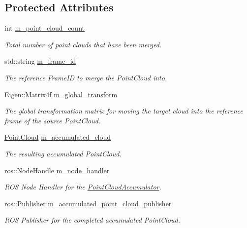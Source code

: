 \subsection*{\-Protected \-Attributes}
\begin{DoxyCompactItemize}
\item 
int \hyperlink{class_point_cloud_accumulator_a6ebb0ca53506f1ae2d0f6e411e2dff66}{m\-\_\-point\-\_\-cloud\-\_\-count}
\begin{DoxyCompactList}\small\item\em \-Total number of point clouds that have been merged. \end{DoxyCompactList}\item 
std\-::string \hyperlink{class_point_cloud_accumulator_af8ef35b00c6d547b8d3fa89ad8a8b49a}{m\-\_\-frame\-\_\-id}
\begin{DoxyCompactList}\small\item\em \-The reference \-Frame\-I\-D to merge the \-Point\-Cloud into. \end{DoxyCompactList}\item 
\-Eigen\-::\-Matrix4f \hyperlink{class_point_cloud_accumulator_a7ea0dd4449475e6939cefbdb0fd260c5}{m\-\_\-global\-\_\-transform}
\begin{DoxyCompactList}\small\item\em \-The global transformation matrix for moving the target cloud into the reference frame of the source \-Point\-Cloud. \end{DoxyCompactList}\item 
\hyperlink{_helper_functions_8h_abb956d1047f4dd2c956fe3cb0dd0004d}{\-Point\-Cloud} \hyperlink{class_point_cloud_accumulator_a0db3c1a8e6de37bcb25c260626d63ff0}{m\-\_\-accumulated\-\_\-cloud}
\begin{DoxyCompactList}\small\item\em \-The resulting accumulated \-Point\-Cloud. \end{DoxyCompactList}\item 
ros\-::\-Node\-Handle \hyperlink{class_point_cloud_accumulator_ac9070e4cb82ddf04bb50cc2492e597ae}{m\-\_\-node\-\_\-handler}
\begin{DoxyCompactList}\small\item\em \-R\-O\-S \-Node \-Handler for the \hyperlink{class_point_cloud_accumulator}{\-Point\-Cloud\-Accumulator}. \end{DoxyCompactList}\item 
ros\-::\-Publisher \hyperlink{class_point_cloud_accumulator_a117cbef73e39daeda50c32212a3cc603}{m\-\_\-accumulated\-\_\-point\-\_\-cloud\-\_\-publisher}
\begin{DoxyCompactList}\small\item\em \-R\-O\-S \-Publisher for the completed accumulated \-Point\-Cloud. \end{DoxyCompactList}\end{DoxyCompactItemize}
